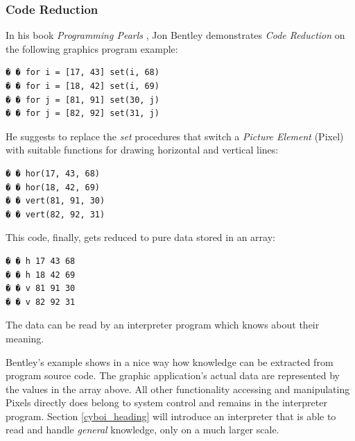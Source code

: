 %
%
%
%
%
%
%

\subsubsection{Code Reduction}
\label{code_reduction_heading}

In his book \emph{Programming Pearls} \cite[page 128]{bentley}, Jon Bentley
demonstrates \emph{Code Reduction} on the following graphics program example:

\begin{scriptsize}
    \begin{verbatim}
� � for i = [17, 43] set(i, 68)
� � for i = [18, 42] set(i, 69)
� � for j = [81, 91] set(30, j)
� � for j = [82, 92] set(31, j)
    \end{verbatim}
\end{scriptsize}

He suggests to replace the \emph{set} procedures that switch a
\emph{Picture Element} (Pixel) with suitable functions for drawing horizontal
and vertical lines:

\begin{scriptsize}
    \begin{verbatim}
� � hor(17, 43, 68)
� � hor(18, 42, 69)
� � vert(81, 91, 30)
� � vert(82, 92, 31)
    \end{verbatim}
\end{scriptsize}

This code, finally, gets reduced to pure data stored in an array:

\begin{scriptsize}
    \begin{verbatim}
� � h 17 43 68
� � h 18 42 69
� � v 81 91 30
� � v 82 92 31
    \end{verbatim}
\end{scriptsize}

The data can be read by an interpreter program which knows about their meaning.

Bentley's example shows in a nice way how knowledge can be extracted from program
source code. The graphic application's actual data are represented by the values
in the array above. All other functionality accessing and manipulating Pixels
directly does belong to system control and remains in the interpreter program.
Section \ref{cyboi_heading} will introduce an interpreter that is able to read
and handle \emph{general} knowledge, only on a much larger scale.
